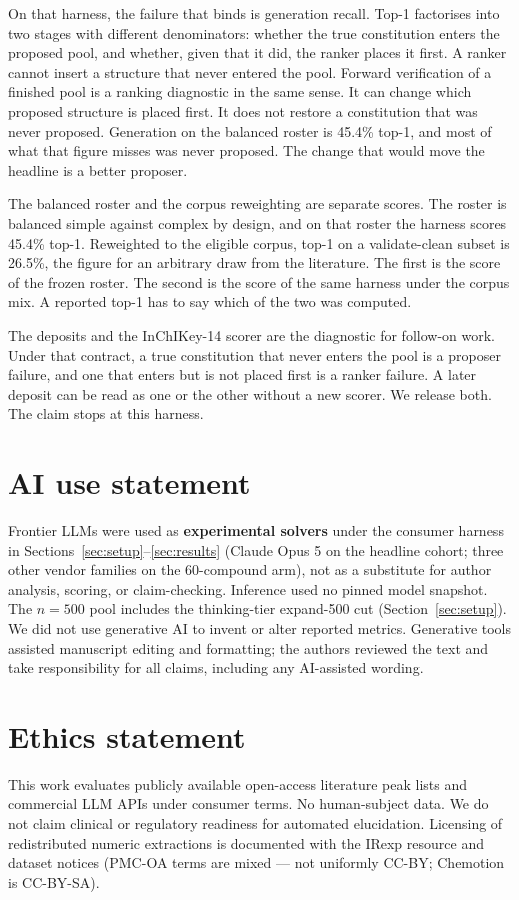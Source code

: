 \documentclass{article}
\begin{document}
On that harness, the failure that binds is generation recall.
Top-1 factorises into two stages with different denominators: whether the
true constitution enters the proposed pool, and whether, given that it
did, the ranker places it first.
A ranker cannot insert a structure that never entered the pool.
Forward verification of a finished pool is a ranking diagnostic in the
same sense.
It can change which proposed structure is placed first.
It does not restore a constitution that was never proposed.
Generation on the balanced roster is 45.4\% top-1, and most of what that
figure misses was never proposed.
The change that would move the headline is a better proposer.

The balanced roster and the corpus reweighting are separate scores.
The roster is balanced simple against complex by design, and on that
roster the harness scores 45.4\% top-1.
Reweighted to the eligible corpus, top-1 on a validate-clean subset is
26.5\%, the figure for an arbitrary draw from the literature.
The first is the score of the frozen roster.
The second is the score of the same harness under the corpus mix.
A reported top-1 has to say which of the two was computed.

The deposits and the InChIKey-14 scorer are the diagnostic for follow-on
work.
Under that contract, a true constitution that never enters the pool is a
proposer failure, and one that enters but is not placed first is a ranker
failure.
A later deposit can be read as one or the other without a new scorer.
We release both.
The claim stops at this harness.

\newpage
\section*{AI use statement}
Frontier LLMs were used as \textbf{experimental solvers} under the consumer harness in
Sections~\ref{sec:setup}--\ref{sec:results} (Claude Opus 5 on the headline cohort; three
other vendor families on the 60-compound arm), not as a substitute for author analysis,
scoring, or claim-checking.
Inference used no pinned model snapshot.
The $n{=}500$ pool includes the thinking-tier expand-500 cut (Section~\ref{sec:setup}).
We did not use generative AI to invent or alter reported metrics.
Generative tools assisted manuscript editing and formatting; the authors reviewed the text
and take responsibility for all claims, including any AI-assisted wording.

\section*{Ethics statement}
This work evaluates publicly available open-access literature peak lists and commercial LLM
APIs under consumer terms.
No human-subject data.
We do not claim clinical or regulatory readiness for automated elucidation.
Licensing of redistributed numeric extractions is documented with the IRexp
resource and dataset notices (PMC-OA terms are mixed --- not uniformly CC-BY; Chemotion is CC-BY-SA).
\end{document}
